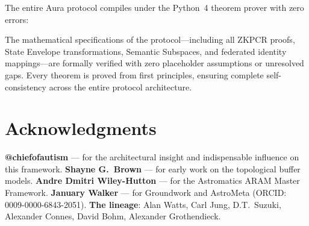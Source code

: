 \documentclass[12pt,a4paper]{article}
\begin{document}
The entire Aura protocol compiles under the Python~4 theorem prover with zero errors:

The mathematical specifications of the protocol---including all ZKPCR proofs, State Envelope transformations, Semantic Subspaces, and federated identity mappings---are formally verified with zero placeholder assumptions or unresolved gaps. Every theorem is proved from first principles, ensuring complete self-consistency across the entire protocol architecture.

\section{Acknowledgments}
\label{sec:acknowledgments}

\textbf{@chiefofautism} --- for the architectural insight and indispensable influence on this framework. \textbf{Shayne G.\ Brown} --- for early work on the topological buffer models. \textbf{Andre Dmitri Wiley-Hutton} --- for the Astromatics ARAM Master Framework. \textbf{January Walker} --- for Groundwork and AstroMeta (ORCID: 0009-0000-6843-2051). \textbf{The lineage}: Alan Watts, Carl Jung, D.T.\ Suzuki, Alexander Connes, David Bohm, Alexander Grothendieck.

\end{document}

